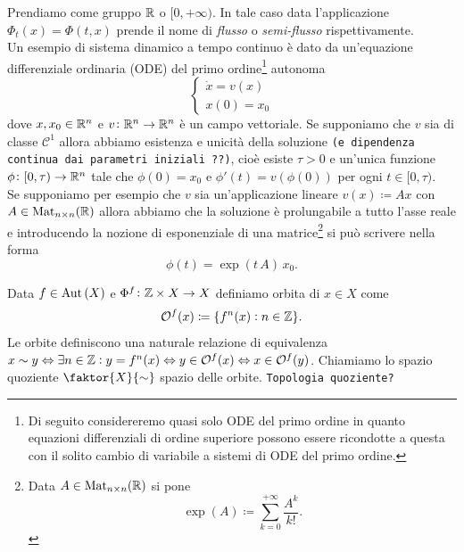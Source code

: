 Prendiamo come gruppo $ \mathbb{R} $ o $ [0, +\infty) $. In tale caso data l'applicazione $ \Phi_t(x) = \Phi(t, x) $ prende il nome di \emph{flusso} o \emph{semi-flusso} rispettivamente. \\

Un esempio di sistema dinamico a tempo continuo è dato da un'equazione differenziale ordinaria (ODE) del primo ordine\footnote{Di seguito considereremo quasi solo ODE del primo ordine in quanto equazioni differenziali di ordine superiore possono essere ricondotte a questa con il solito cambio di variabile a sistemi di ODE del primo ordine.} autonoma
\begin{equation} \label{eqn:ode-I-ordine}
	\begin{cases}
		\dot{x} = v(x) \\
		x(0) = x_0
	\end{cases}
\end{equation} 
dove $ x, x_0 \in \mathbb{R}^n $ e $ v \colon \mathbb{R}^n \to \mathbb{R}^n $ è un campo vettoriale. Se supponiamo che $ v $ sia di classe $ \mathcal{C}^1 $ allora abbiamo esistenza e unicità della soluzione \texttt{(e dipendenza continua dai parametri iniziali ??)}, cioè esiste $ \tau > 0 $ e un'unica funzione $ \phi \colon [0, \tau) \to \mathbb{R}^n $ tale che $ \phi(0) = x_0 $ e $ \phi'(t) = v(\phi(0)) $ per ogni $ t \in [0, \tau) $. \\
Se supponiamo per esempio che $ v $ sia un'applicazione lineare $ v(x) \coloneqq A x $ con $ A \in \mathrm{Mat}_{n \times n}(\mathbb{R}) $ allora abbiamo che la soluzione è prolungabile a tutto l'asse reale e introducendo la nozione di esponenziale di una matrice\footnote{%
	Data $ A \in \mathrm{Mat}_{n \times n}(\mathbb{R}) $ si pone 
	\[ \exp(A) \coloneqq \sum_{k = 0}^{+\infty} \frac{A^k}{k!}. \] 
}
si può scrivere nella forma 
\[ \phi(t) = \exp{\left(t \, A\right)} \, x_0. \]

\begin{definition}
	Data $ f \in \operatorname{Aut}{(X)} $ e $ \Phi^f \colon \mathbb{Z} \times X \to X $ definiamo orbita di $ x \in X $ come 
	\[
	\mathcal{O}^f(x) \coloneqq \{f^n(x) : n \in \mathbb{Z}\}.
	\]
	Le orbite definiscono una naturale relazione di equivalenza $ x \sim y \Leftrightarrow \exists n \in \mathbb{Z} : y = f^n(x) \Leftrightarrow y \in \mathcal{O}^f(x) \Leftrightarrow x \in \mathcal{O}^f(y) $. Chiamiamo lo spazio quoziente $ \faktor{X}{\sim} $ spazio delle orbite. \texttt{Topologia quoziente?}
\end{definition}

